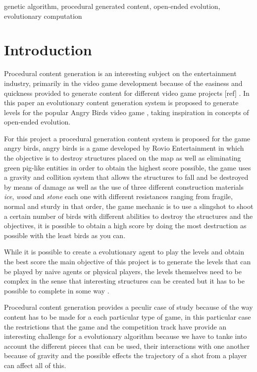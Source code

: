 \documentclass[conference]{IEEEtran}
\begin{document}
\begin{IEEEkeywords}
genetic algorithm, procedural generated content, open-ended evolution,
evolutionary computation
\end{IEEEkeywords}

\section{Introduction}
Procedural content generation is an interesting subject on the entertainment
industry, primarily in the video game development because of the easiness and
quickness provided to generate content for different video game projects [ref] .
In this paper an evolutionary content generation system is proposed to generate
levels for the popular Angry Birds video game
\cite{RovioEntertainmentCorporation2009}, taking inspiration in concepts of
open-ended evolution.


For this project a procedural generation content system is proposed for the game
angry birds, angry birds is a game developed by Rovio Entertainment in which the
objective is to destroy structures placed on the map as well as eliminating
green pig-like entities in order to obtain the highest score possible, the game
uses a gravity and collition system that allows the structures to fall and be
destroyed by means of damage as well as the use of three different construction
materials \textit{ice}, \textit{wood} and \textit{stone} each one with different
resistances ranging from fragile, normal and sturdy in that order, the game
mechanic is to use a slingshot to shoot a certain number of birds with different
abilities to destroy the structures and the objectives, it is possible to obtain
a high score by doing the most destruction as possible with the least birds as
you can. \cite{RovioEntertainmentCorporation2009}

While it is possible to create a evolutionary agent to play the levels and
obtain the best score the main objective of this project is to generate the
levels that can be played by naive agents or physical players, the levels
themselves need to be complex in the sense that interesting structures can be
created but it has to be possible to complete in some way
\cite{Stephenson,Stephenson2018}.

Procedural content generation provides a peculir case of study because of the way
content has to be made for a each particular type of game, in this particular case 
the restrictions that the game and the competition track have provide an interesting 
challenge for a evolutionary algorithm because we have to tanke into account the 
different pieces that can be used, their interactions with one another because of 
gravity and the possible effects the trajectory of a shot from a player can affect 
all of this.
\end{document}
